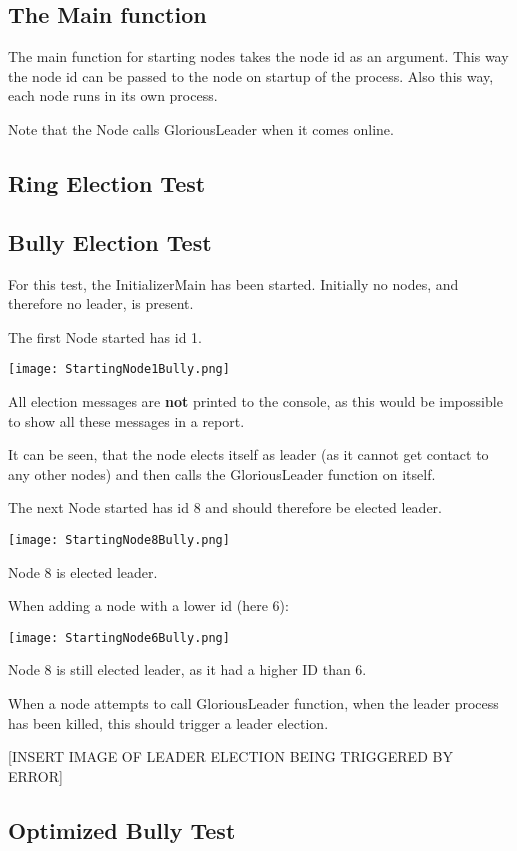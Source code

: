 \subsection{The Main function}
The main function for starting nodes takes the node id as an argument. This way the node id can be passed to the node on startup of the process. Also this way, each node runs in its own process.

\begin{center}
\end{center}

Note that the Node calls GloriousLeader when it comes online. 

\subsection{Ring Election Test}

\subsection{Bully Election Test}
For this test, the InitializerMain has been started. Initially no nodes, and therefore no leader, is present. 

The first Node started has id 1.

\begin{center}
	\texttt{[image: StartingNode1Bully.png]}
\end{center}

All election messages are \textbf{not} printed to the console, as this would be impossible to show all these messages in a report.

It can be seen, that the node elects itself as leader (as it cannot get contact to any other nodes) and then calls the GloriousLeader function on itself. 

The next Node started has id 8 and should therefore be elected leader.

\begin{center}
	\texttt{[image: StartingNode8Bully.png]}
\end{center}

Node 8 is elected leader. 

When adding a node with a lower id (here 6):

\begin{center}
	\texttt{[image: StartingNode6Bully.png]}
\end{center}

Node 8 is still elected leader, as it had a higher ID than 6.

When a node attempts to call GloriousLeader function, when the leader process has been killed, this should trigger a leader election. 

[INSERT IMAGE OF LEADER ELECTION BEING TRIGGERED BY ERROR]

\subsection{Optimized Bully Test}
